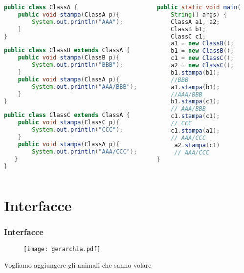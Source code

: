 \documentclass{beamer}
\begin{document}
\begin{frame}[fragile]
\begin{columns}
\begin{column}{0.6\textwidth}
\begin{lstlisting}[language=Java,escapechar=|]
public class ClassA {
    public void stampa(ClassA p){
        System.out.println("AAA");
    }
}
\end{lstlisting}
\begin{lstlisting}[language=Java,escapechar=|]
public class ClassB extends ClassA {
    public void stampa(ClassB p){
        System.out.println("BBB");
    }
    public void stampa(ClassA p){
        System.out.println("AAA/BBB");
    }
}
\end{lstlisting}
\begin{lstlisting}[language=Java,escapechar=|]
public class ClassC extends ClassA {
    public void stampa(ClassC p){
        System.out.println("CCC");
    }
    public void stampa(ClassA p){
        System.out.println("AAA/CCC");
   }
}
\end{lstlisting}
\end{column}
\begin{column}{0.4\textwidth}
\begin{lstlisting}[language=Java,escapechar=|]
public static void main(
    String[] args) {
    ClassA a1, a2;
    ClassB b1;
    ClassC c1;
    a1 = new ClassB();
    b1 = new ClassB();
    c1 = new ClassC();
    a2 = new ClassC();
    b1.stampa(b1); 
    //BBB
    a1.stampa(b1);  
    //AAA/BBB
    b1.stampa(c1); 
    // AAA/BBB
    c1.stampa(c1); 
    // CCC
    c1.stampa(a1); 
    // AAA/CCC
     a2.stampa(c1) 
     // AAA/CCC
}
\end{lstlisting}
\end{column}
\end{columns}
\end{frame}





\section{Interfacce}
\begin{frame}[fragile]
\frametitle{Interfacce}
\begin{figure}[h!]
  \centering
    \texttt{[image: gerarchia.pdf]}
\end{figure}
Vogliamo aggiungere gli animali che sanno volare
\end{frame}
\end{document}
